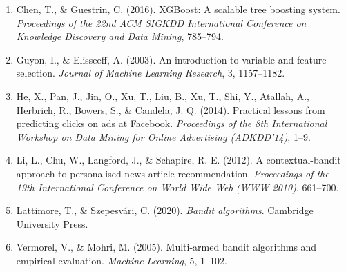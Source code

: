 \documentclass[12pt]{article}
\begin{document}
\begin{enumerate}

\item \label{ref:Chen2016} Chen, T., \& Guestrin, C. (2016). XGBoost: A scalable tree boosting system. \textit{Proceedings of the 22nd ACM SIGKDD International Conference on Knowledge Discovery and Data Mining}, 785--794.

\item \label{ref:Guyon2003} Guyon, I., \& Elisseeff, A. (2003). An introduction to variable and feature selection. \textit{Journal of Machine Learning Research}, 3, 1157--1182.

\item He, X., Pan, J., Jin, O., Xu, T., Liu, B., Xu, T., Shi, Y., Atallah, A., Herbrich, R., Bowers, S., \& Candela, J. Q. (2014). Practical lessons from predicting clicks on ads at Facebook. \textit{Proceedings of the 8th International Workshop on Data Mining for Online Advertising (ADKDD'14)}, 1--9.

\item \label{ref:Li2012} Li, L., Chu, W., Langford, J., \& Schapire, R. E. (2012). A contextual-bandit approach to personalised news article recommendation. \textit{Proceedings of the 19th International Conference on World Wide Web (WWW 2010)}, 661--700.

\item Lattimore, T., \& Szepesvári, C. (2020). \textit{Bandit algorithms}. Cambridge University Press.

\item Vermorel, V., \& Mohri, M. (2005). Multi-armed bandit algorithms and empirical evaluation. \textit{Machine Learning}, 5, 1--102.

\end{enumerate}

\newpage
\appendix
\end{document}
